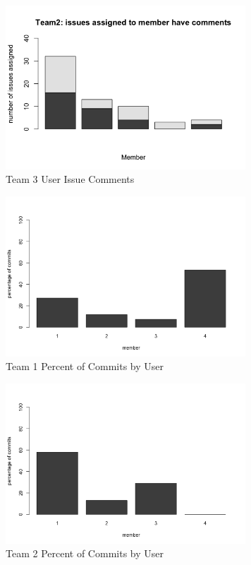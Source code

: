 \documentclass[conference]{IEEEtran}
\begin{document}
\begin{figure}[H]
    \centering
    \includegraphics[width=9cm]{../AprilProject/pic/team3_user_issue_comments.png}
    \caption{Team 3 User Issue Comments}
    \label{team3_issue_comment}
\end{figure}

\begin{figure}[H]
    \centering
    \includegraphics[width=9cm]{../AprilProject/pic/users commit percentage team1.png}
    \caption{Team 1 Percent of Commits by User}
    \label{team1_percent_commit}
\end{figure}

\begin{figure}[H]
    \centering
    \includegraphics[width=9cm]{../AprilProject/pic/users commit percentage team2.png}
    \caption{Team 2 Percent of Commits by User}
    \label{team2_percent_commit}
\end{figure}
\end{document}
